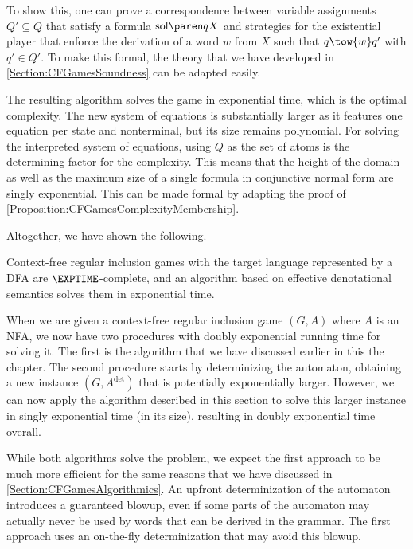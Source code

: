 \documentclass[../../diss.tex]{subfiles}
\begin{document}
To show this, one can prove a correspondence between variable assignments $Q' \subseteq Q$ that satisfy a formula $\sol{qX}$ and strategies for the existential player that enforce the derivation of a word $w$ from $X$ such that $q \tow{w} q'$ with $q' \in Q'$.
To make this formal, the theory that we have developed in \cref{Section:CFGamesSoundness} can be adapted easily.

The resulting algorithm solves the game in exponential time, which is the optimal complexity.
The new system of equations is substantially larger as it features one equation per state and nonterminal, but its size remains polynomial.
For solving the interpreted system of equations, using $Q$ as the set of atoms is the determining factor for the complexity.
This means that the height of the domain as well as the maximum size of a single formula in conjunctive normal form are singly exponential.
This can be made formal by adapting the proof of \cref{Proposition:CFGamesComplexityMembership}.

Altogether, we have shown the following.

\begin{theorem}
    Context-free regular inclusion games with the target language represented by a DFA are $\EXPTIME$-complete,
    and an algorithm based on effective denotational semantics solves them in exponential time.
\end{theorem}

When we are given a context-free regular inclusion game $(G,A)$ where $A$ is an NFA, we now have two procedures with doubly exponential running time for solving it.
The first is the algorithm that we have discussed earlier in this the chapter.
The second procedure  starts by determinizing the automaton, obtaining a new instance $(G,A^{\text{det}})$ that is potentially exponentially larger.
However, we can now apply the algorithm described in this section to solve this larger instance in singly exponential time (in its size), resulting in doubly exponential time overall.

While both algorithms solve the problem, we expect the first approach to be much more efficient for the same reasons that we have discussed in \cref{Section:CFGamesAlgorithmics}.
An upfront determinization of the automaton introduces a guaranteed blowup, even if some parts of the automaton may actually never be used by words that can be derived in the grammar.
The first approach uses an on-the-fly determinization that may avoid this blowup.
\end{document}
